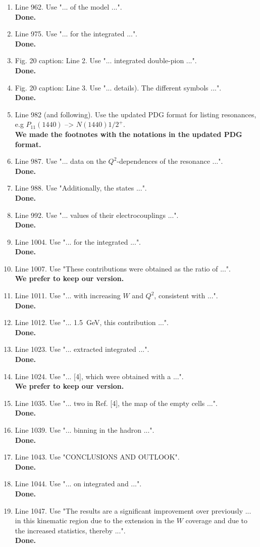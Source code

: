 \documentclass[,superscriptaddress,showpacs,amssymb,amsmath,amsfonts,linenumbers,article]{revtex4-1}
\begin{document}
\begin{itemize}
\begin{enumerate}
\item Line 962. Use "... of the model ...".\\
{\bf Done.}
\item Line 975. Use "... for the integrated ...".\\
{\bf Done.}
\item Fig. 20 caption: Line 2. Use "... integrated double-pion ...".\\
{\bf Done.}
\item Fig. 20 caption: Line 3. Use "... details). The different symbols ...".\\
{\bf Done.}
\item Line 982 (and following). Use the updated PDG format for listing resonances, e.g $P_{11}(1440)$ --> $N(1440)1/2^+$.\\
{\bf We made the footnotes with the notations in the updated PDG format.}
\item Line 987. Use "... data on the $Q^2$-dependences of the resonance ...".\\
{\bf Done.}
\item Line 988. Use "Additionally, the states ...".\\
{\bf Done.}
\item Line 992. Use "... values of their electrocouplings ...".\\
{\bf Done.}
\item Line 1004. Use "... for the integrated ...".\\
{\bf Done.}
\item Line 1007. Use "These contributions were obtained as the ratio of ...".\\
{\bf We prefer to keep our version.}
\item Line 1011. Use "... with increasing $W$ and $Q^2$, consistent with ...".\\
{\bf Done.}
\item Line 1012. Use "... 1.5~GeV, this contribution ...".\\
{\bf Done.}
\item Line 1023. Use "... extracted integrated ...".\\
{\bf Done.}
\item Line 1024. Use "... [4], which were obtained with a ...".\\
{\bf We prefer to keep our version.}
\item Line 1035. Use "... two in Ref. [4], the map of the empty cells ...".\\
{\bf Done.}
\item Line 1039. Use "... binning in the hadron ...".\\
{\bf Done.}
\item Line 1043. Use "CONCLUSIONS AND OUTLOOK".\\
{\bf Done.}
\item Line 1044. Use "... on integrated and ...".\\
{\bf Done.}
\item Line 1047. Use "The results are a significant improvement over previously ...  in this kinematic region due to the extension in the $W$ coverage and due  to the increased statistics, thereby ...".\\
{\bf Done.}



\end{enumerate}
\end{itemize}
\end{document}
